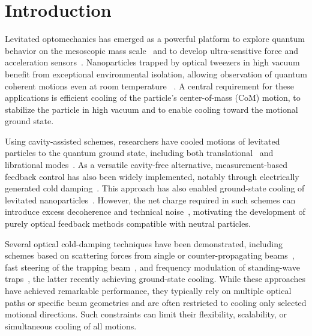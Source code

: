 \documentclass[%
 reprint,
 amsmath,amssymb,
 aps,
prl,
]{revtex4-2}
\begin{document}
\maketitle





\section{Introduction}

Levitated optomechanics has emerged as a powerful platform to explore quantum behavior on the mesoscopic mass scale~\cite{gonzalez-ballestero_levitodynamics_2021} and to develop ultra-sensitive force and acceleration sensors~\cite{ranjit_zeptonewton_2016, monteiro_force_2020, moore_searching_2021}. Nanoparticles trapped by optical tweezers in high vacuum benefit from exceptional environmental isolation, allowing observation of quantum coherent motions even at room temperature ~\cite{chang_cavity_2010, romero-isart_toward_2010}. A central requirement for these applications is efficient cooling of the particle's center-of-mass (CoM) motion, to stabilize the particle in high vacuum and to enable cooling toward the motional ground state.

Using cavity-assisted schemes, researchers have cooled motions of levitated particles to the quantum ground state, including both translational~\cite{delic_cooling_2020, ranfagni_two-dimensional_2022, piotrowski_simultaneous_2023} and librational modes~\cite{dania_high-purity_2025, troyer_quantum_2025_2}. 
%
As a versatile cavity-free alternative, measurement-based feedback control has also been widely implemented, notably through electrically generated cold  damping~\cite{tebbenjohanns_cold_2019, conangla_optimal_2019, kremer_all-electrical_2024}. This approach has also enabled ground-state cooling of levitated nanoparticles~\cite{magrini_real-time_2021, tebbenjohanns_quantum_2021}.
%
However, the net charge required in such schemes can introduce excess decoherence and technical noise~\cite{hebestreit_sensing_2018, kamba_quantum_2025}, motivating the development of purely optical feedback methods compatible with neutral particles.

Several optical cold-damping techniques have been demonstrated, including schemes based on scattering forces from single \cite{dania_optical_2021} or counter-propagating beams~\cite{li_millikelvin_2011}, fast steering of the trapping beam~\cite{vijayan_scalable_2023}, and frequency modulation of standing-wave traps~\cite{kamba_optical_2022}, the latter recently achieving ground-state cooling. While these approaches have achieved remarkable performance, they typically rely on multiple optical paths or specific beam geometries and are often restricted to cooling only selected motional directions. Such constraints can limit their flexibility, scalability, or simultaneous cooling of all motions.
\end{document}
